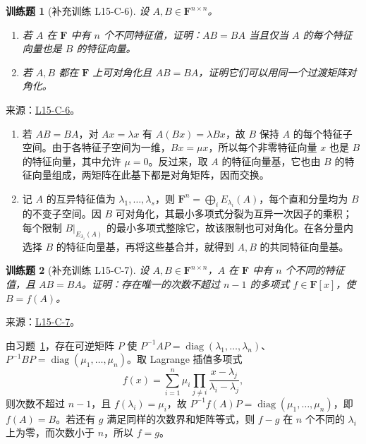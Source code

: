 \documentclass[UTF8,12pt,a4paper,fontset=fandol]{ctexart}
\newtheorem{exercise}{训练题}[section]
\begin{document}
\begin{exercise}[补充训练 L15-C-6]\label{prob:L15-C-6}
设 $A,B\in\mathbf F^{n\times n}$。
\begin{enumerate}
\item 若 $A$ 在 $\mathbf F$ 中有 $n$ 个不同特征值，证明：$AB=BA$ 当且仅当 $A$ 的每个特征向量也是 $B$ 的特征向量。
\item 若 $A,B$ 都在 $\mathbf F$ 上可对角化且 $AB=BA$，证明它们可以用同一个过渡矩阵对角化。
\end{enumerate}
\end{exercise}
\noindent 来源：\href{https://github.com/yhwu-is/Linear-Algebra-Left-Undone/blob/new/%E8%AE%B2%E4%B9%89/%E4%B8%93%E9%A2%98/15%20%E7%9B%B8%E4%BC%BC%E6%A0%87%E5%87%86%E5%BD%A2%EF%BC%9A%E5%A4%8D%E6%95%B0%E5%9F%9F%E4%B8%8A%E7%9A%84%E5%B0%9D%E8%AF%95%E4%B8%8E%E7%90%86%E8%AE%BA.tex}{L15-C-6}。
\begin{solve}
\begin{enumerate}
\item 若 $AB=BA$，对 $Ax=\lambda x$ 有 $A(Bx)=\lambda Bx$，故 $B$ 保持 $A$ 的每个特征子空间。由于各特征子空间为一维，$Bx=\mu x$，所以每个非零特征向量 $x$ 也是 $B$ 的特征向量，其中允许 $\mu=0$。反过来，取 $A$ 的特征向量基，它也由 $B$ 的特征向量组成，两矩阵在此基下都是对角矩阵，因而交换。
\item 记 $A$ 的互异特征值为 $\lambda_1,\ldots,\lambda_s$，则 $\mathbf F^n=\bigoplus_i E_{\lambda_i}(A)$，每个直和分量均为 $B$ 的不变子空间。因 $B$ 可对角化，其最小多项式分裂为互异一次因子的乘积；每个限制 $B|_{E_{\lambda_i}(A)}$ 的最小多项式整除它，故该限制也可对角化。在各分量内选择 $B$ 的特征向量基，再将这些基合并，就得到 $A,B$ 的共同特征向量基。
\end{enumerate}
\end{solve}

\begin{exercise}[补充训练 L15-C-7]\label{prob:L15-C-7}
设 $A,B\in\mathbf F^{n\times n}$，$A$ 在 $\mathbf F$ 中有 $n$ 个不同的特征值，且 $AB=BA$。证明：存在唯一的次数不超过 $n-1$ 的多项式 $f\in\mathbf F[x]$，使 $B=f(A)$。
\end{exercise}
\noindent 来源：\href{https://github.com/yhwu-is/Linear-Algebra-Left-Undone/blob/new/%E8%AE%B2%E4%B9%89/%E4%B8%93%E9%A2%98/15%20%E7%9B%B8%E4%BC%BC%E6%A0%87%E5%87%86%E5%BD%A2%EF%BC%9A%E5%A4%8D%E6%95%B0%E5%9F%9F%E4%B8%8A%E7%9A%84%E5%B0%9D%E8%AF%95%E4%B8%8E%E7%90%86%E8%AE%BA.tex}{L15-C-7}。
\begin{solve}
由习题~\ref{prob:L15-C-6}，存在可逆矩阵 $P$ 使 $P^{-1}AP=\operatorname{diag}(\lambda_1,\ldots,\lambda_n)$、$P^{-1}BP=\operatorname{diag}(\mu_1,\ldots,\mu_n)$。取 Lagrange 插值多项式
\[f(x)=\sum_{i=1}^n\mu_i\prod_{j\ne i}\frac{x-\lambda_j}{\lambda_i-\lambda_j},\]
则次数不超过 $n-1$，且 $f(\lambda_i)=\mu_i$，故 $P^{-1}f(A)P=\operatorname{diag}(\mu_1,\ldots,\mu_n)$，即 $f(A)=B$。若还有 $g$ 满足同样的次数界和矩阵等式，则 $f-g$ 在 $n$ 个不同的 $\lambda_i$ 上为零，而次数小于 $n$，所以 $f=g$。
\end{solve}
\end{document}
